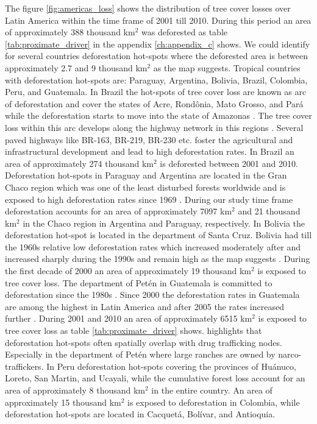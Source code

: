 			The figure \ref{fig:americas_loss} shows the distribution of tree cover losses over Latin America within the time frame of 2001 till 2010. During this period an area of approximately 388 thousand km$^2$ was deforested as table \ref{tab:proximate_driver} in the appendix \ref{ch:appendix_c} shows. We could identify for several countries deforestation hot-spots where the deforested area is between approximately 2.7 and 9 thousand km$^2$ as the map suggests. Tropical countries with deforestation hot-spots are: Paraguay, Argentina, Bolivia, Brazil, Colombia, Peru, and Guatemala. In Brazil the hot-spots of tree cover loss are known as arc of deforestation and cover the states of Acre, Rond\^{o}nia, Mato Grosso, and Pará while the deforestation starts to move into the state of Amazonas \citep{Wood2002}. The tree cover loss within this arc develops along the highway network in this regions \citep{Alves2002,Mueller2016}. Several paved highways like BR-163, BR-219, BR-230 etc. foster the agricultural and infrastructural development and lead to high deforestation rates. In Brazil an area of approximately 274 thousand km$^2$ is deforested between 2001 and 2010. Deforestation hot-spots in Paraguay and Argentina are located in the Gran Chaco region which was one of the least disturbed forests worldwide and is exposed to high deforestation rates since 1969 \citep{Caldas2013,Zak2004}. During our study time frame deforestation accounts for an area of approximately 7097 km$^2$ and 21 thousand km$^2$ in the Chaco region in Argentina and Paraguay, respectively. In Bolivia the deforestation hot-spot is located in the department of Santa Cruz. Bolivia had till the 1960s relative low deforestation rates which increased moderately after and increased sharply during the 1990s and remain high as the map suggests \citep{Pacheco2002,DavidKaimowitz2002}. During the first decade of 2000 an area of approximately 19 thousand km$^2$ is exposed to tree cover loss. The department of Petén in Guatemala is committed to deforestation since the 1980s \citep{Beach1998}. Since 2000 the deforestation rates in Guatemala are among the highest in Latin America and after 2005 the rates increased further \citep{McSweeney2014}. During 2001 and 2010 an area of approximately 6515 km$^2$ is exposed to tree cover loss as table \ref{tab:proximate_driver} shows. \citeauthor{McSweeney2014} highlights that deforestation hot-spots often spatially overlap with drug trafficking nodes. Especially in the department of Petén where large ranches are owned by narco-traffickers. In Peru deforestation hot-spots covering the provinces of Huánuco, Loreto, San Martin, and Ucayali, while the cumulative forest loss account for an area of approximately 8 thousand km$^2$ in the entire country. An area of approximately 15 thousand km$^2$ is exposed to deforestation in Colombia, while deforestation hot-spots are located in Cacquetá, Bolívar, and Antioquia.
